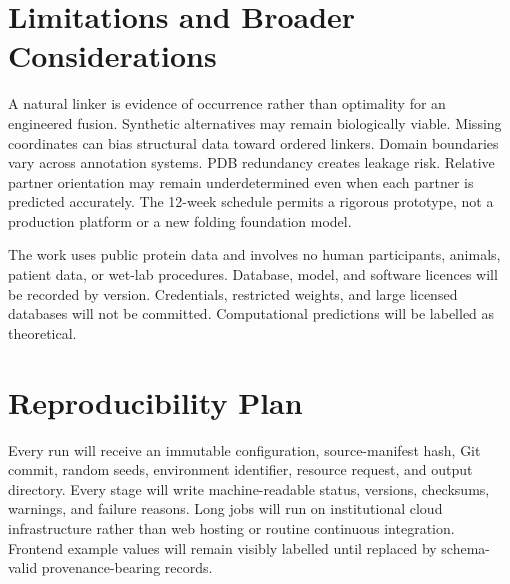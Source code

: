\documentclass[10pt,a4paper]{article}
\begin{document}
\section{Limitations and Broader Considerations}

A natural linker is evidence of occurrence rather than optimality for an engineered fusion. Synthetic alternatives may remain biologically viable. Missing coordinates can bias structural data toward ordered linkers. Domain boundaries vary across annotation systems. PDB redundancy creates leakage risk. Relative partner orientation may remain underdetermined even when each partner is predicted accurately. The 12-week schedule permits a rigorous prototype, not a production platform or a new folding foundation model.

The work uses public protein data and involves no human participants, animals, patient data, or wet-lab procedures. Database, model, and software licences will be recorded by version. Credentials, restricted weights, and large licensed databases will not be committed. Computational predictions will be labelled as theoretical.

\section{Reproducibility Plan}

Every run will receive an immutable configuration, source-manifest hash, Git commit, random seeds, environment identifier, resource request, and output directory. Every stage will write machine-readable status, versions, checksums, warnings, and failure reasons. Long jobs will run on institutional cloud infrastructure rather than web hosting or routine continuous integration. Frontend example values will remain visibly labelled until replaced by schema-valid provenance-bearing records.
\end{document}
